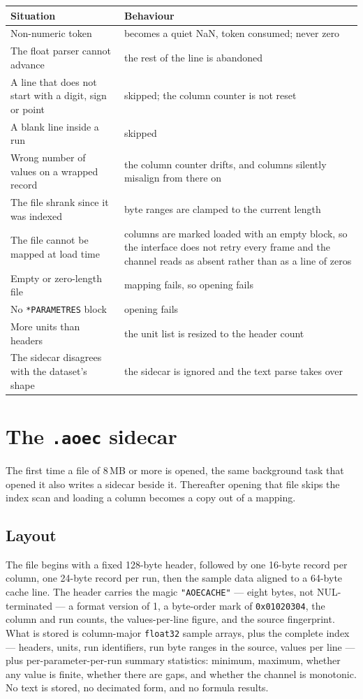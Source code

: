 \documentclass[11pt,a4paper,oneside]{report}
\newcommand{\code}[1]{\texttt{#1}}
\begin{document}
\begin{center}
\small
\begin{tabular}{@{}p{}p{}@{}}
\toprule
\textbf{Situation} & \textbf{Behaviour} \\
\midrule
Non-numeric token & becomes a quiet NaN, token consumed; never zero \\
The float parser cannot advance & the rest of the line is abandoned \\
A line that does not start with a digit, sign or point & skipped; the column counter is not reset \\
A blank line inside a run & skipped \\
Wrong number of values on a wrapped record & the column counter drifts, and columns silently misalign from there on \\
The file shrank since it was indexed & byte ranges are clamped to the current length \\
The file cannot be mapped at load time & columns are marked loaded with an empty block, so the interface does not retry every frame and the channel reads as absent rather than as a line of zeros \\
Empty or zero-length file & mapping fails, so opening fails \\
No \code{*PARAMETRES} block & opening fails \\
More units than headers & the unit list is resized to the header count \\
The sidecar disagrees with the dataset's shape & the sidecar is ignored and the text parse takes over \\
\bottomrule
\end{tabular}
\end{center}

\section{The \code{.aoec} sidecar}

The first time a file of 8\,MB or more is opened, the same background task that
opened it also writes a sidecar beside it. Thereafter opening that file skips the
index scan and loading a column becomes a copy out of a mapping.

\subsection{Layout}

The file begins with a fixed 128-byte header, followed by one 16-byte record per
column, one 24-byte record per run, then the sample data aligned to a 64-byte
cache line. The header carries the magic \code{"AOECACHE"} --- eight bytes, not
NUL-terminated --- a format version of 1, a byte-order mark of
\code{0x01020304}, the column and run counts, the values-per-line figure, and the
source fingerprint. What is stored is column-major \code{float32} sample arrays,
plus the complete index --- headers, units, run identifiers, run byte ranges in
the source, values per line --- plus per-parameter-per-run summary statistics:
minimum, maximum, whether any value is finite, whether there are gaps, and
whether the channel is monotonic. No text is stored, no decimated form, and no
formula results.
\end{document}
